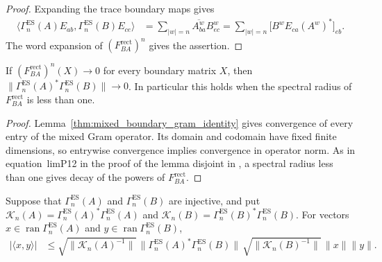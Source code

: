 \begin{proof}
    \leanok
    Expanding the trace boundary maps gives
    \begin{align}
        \langle\Gamma_n^{\mathrm{ES}}(A)E_{ab},\Gamma_n^{\mathrm{ES}}(B)E_{ce}\rangle
         & =\sum_{|w|=n}\overline{A^w_{ba}}B^w_{ec}
        =\sum_{|w|=n}\bigl[B^wE_{ca}(A^w)^*\bigr]_{eb}.
    \end{align}
    The word expansion of $(F_{BA}^{\mathrm{rect}})^n$ gives the assertion.
\end{proof}

\begin{lemma}
    \label{thm:mixed_boundary_gram_decay}
    \leanok
    If $(F_{BA}^{\mathrm{rect}})^n(X)\to0$ for every boundary matrix $X$, then
    $\lVert\Gamma_n^{\mathrm{ES}}(A)^*\Gamma_n^{\mathrm{ES}}(B)\rVert\to0$.
    In particular this holds when the spectral radius of
    $F_{BA}^{\mathrm{rect}}$ is less than one.
\end{lemma}

\begin{proof}
    \leanok
    Lemma~\ref{thm:mixed_boundary_gram_identity} gives convergence of every entry of the mixed
    Gram operator. Its domain and codomain have fixed finite dimensions,
    so entrywise convergence implies convergence in operator norm.
    As in equation~\textup{limP12} in the proof of the lemma \textup{disjoint}
    in \cite{Nachtergaele1996Spectral}, a spectral radius less than one gives
    decay of the powers of $F_{BA}^{\mathrm{rect}}$.
\end{proof}

\begin{lemma}
    \label{thm:ground_space_overlap_mixed_gram}
    \leanok
    Suppose that $\Gamma_n^{\mathrm{ES}}(A)$ and $\Gamma_n^{\mathrm{ES}}(B)$ are injective, and put
    $\mathcal K_n(A)=\Gamma_n^{\mathrm{ES}}(A)^*\Gamma_n^{\mathrm{ES}}(A)$ and
    $\mathcal K_n(B)=\Gamma_n^{\mathrm{ES}}(B)^*\Gamma_n^{\mathrm{ES}}(B)$. For vectors
    $x\in\operatorname{ran}\Gamma_n^{\mathrm{ES}}(A)$ and
    $y\in\operatorname{ran}\Gamma_n^{\mathrm{ES}}(B)$,
    \begin{align}
        |\langle x,y\rangle|
         & \leq\sqrt{\lVert \mathcal K_n(A)^{-1}\rVert}\,
        \lVert\Gamma_n^{\mathrm{ES}}(A)^*\Gamma_n^{\mathrm{ES}}(B)\rVert\,
        \sqrt{\lVert \mathcal K_n(B)^{-1}\rVert}\,
        \lVert x\rVert\lVert y\rVert.
    \end{align}
\end{lemma}

